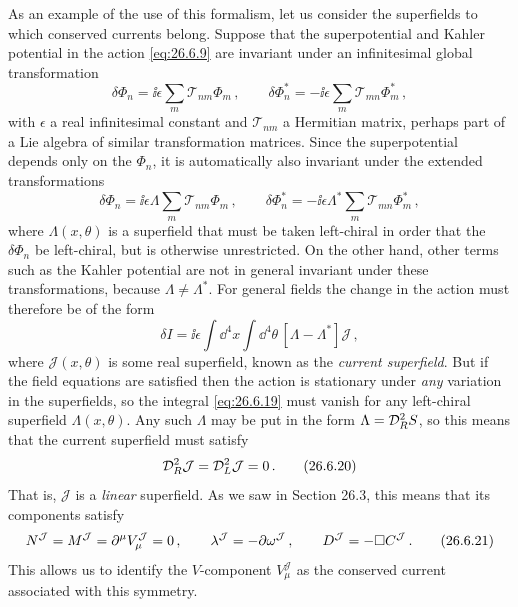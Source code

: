 As an example of the use of this formalism, let us consider the superfields to
which conserved currents belong. Suppose that the superpotential and Kahler
potential in the action \eqref{eq:26.6.9} are invariant under an infinitesimal
global transformation
\begin{equation}
  \delta\Phi_n=\ii\epsilon\sum_m\mathcal{T}_{nm}\Phi_m\,,
  \qquad
  \delta\Phi_n^*=-\ii\epsilon\sum_m\mathcal{T}_{mn}\Phi_m^*\,,
  \tag{26.6.17}\label{eq:26.6.17}
\end{equation}
with \(\epsilon\) a real infinitesimal constant and \(\mathcal{T}_{nm}\) a
Hermitian matrix, perhaps part of a Lie algebra of similar transformation
matrices. Since the superpotential depends only on the \(\Phi_n\), it is
automatically also invariant under the extended transformations
\begin{equation}
  \delta\Phi_n=\ii\epsilon\Lambda\sum_m\mathcal{T}_{nm}\Phi_m\,,
  \qquad
  \delta\Phi_n^*=-\ii\epsilon\Lambda^*
    \sum_m\mathcal{T}_{mn}\Phi_m^*\,,
  \tag{26.6.18}\label{eq:26.6.18}
\end{equation}
where \(\Lambda(x,\theta)\) is a superfield that must be taken left-chiral in
order that the \(\delta\Phi_n\) be left-chiral, but is otherwise unrestricted.
On the other hand, other terms such as the Kahler potential are not in
general invariant under these transformations, because
\(\Lambda\neq\Lambda^*\). For general fields the change in the action must
therefore be of the form
\begin{equation}
  \delta I
  =\ii\epsilon\int \dd^4x\int \dd^4\theta\,[\Lambda-\Lambda^*]\mathcal{J}\,,
  \tag{26.6.19}\label{eq:26.6.19}
\end{equation}
where \(\mathcal{J}(x,\theta)\) is some real superfield, known as the
\emph{current superfield}. But if the field equations are satisfied then the
action is stationary under \emph{any} variation in the superfields, so the
integral \eqref{eq:26.6.19} must vanish for any left-chiral superfield
\(\Lambda(x,\theta)\). Any such \(\Lambda\) may be put in the form
\(\Lambda=\mathcal{D}_R^2S\), so this means that the current superfield must
satisfy
\begin{equation}
  \mathcal{D}_R^2\mathcal{J}=\mathcal{D}_L^2\mathcal{J}=0\,.
  \tag{26.6.20}\label{eq:26.6.20}
\end{equation}
That is, \(\mathcal{J}\) is a \emph{linear} superfield. As we saw in Section
26.3, this means that its components satisfy
\begin{equation}
  N^{\mathcal{J}}=M^{\mathcal{J}}
  =\partial^\mu V_\mu^{\mathcal{J}}=0\,,
  \qquad
  \lambda^{\mathcal{J}}=-\sl{\partial}\omega^{\mathcal{J}}\,,
  \qquad
  D^{\mathcal{J}}=-\Box C^{\mathcal{J}}\,.
  \tag{26.6.21}\label{eq:26.6.21}
\end{equation}
This allows us to identify the \(V\)-component \(V_\mu^{\mathcal{J}}\) as the
conserved current associated with this symmetry.

